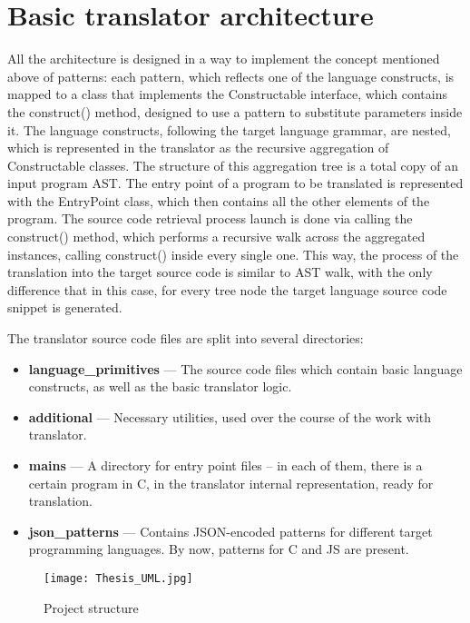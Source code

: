 \section{Basic translator architecture}
All the architecture is designed in a way to implement the concept mentioned above of patterns: each pattern, which reflects one of the language constructs, is mapped to a class that implements the Constructable interface, which contains the construct() method, designed to use a pattern to substitute parameters inside it.
The language constructs, following the target language grammar, are nested, which is represented in the translator as the recursive aggregation of Constructable classes. The structure of this aggregation tree is a total copy of an input program AST.
The entry point of a program to be translated is represented with the EntryPoint class, which then contains all the other elements of the program.
The source code retrieval process launch is done via calling the construct() method, which performs a recursive walk across the aggregated instances, calling construct() inside every single one. This way, the process of the translation into the target source code is similar to AST walk, with the only difference that in this case, for every tree node the target language source code snippet is generated.

The translator source code files are split into several directories:
\begin{itemize}
    \item \textbf{language\_primitives} --- The source code files which contain basic language constructs, as well as the basic translator logic.
    \item \textbf{additional} --- Necessary utilities, used over the course of the work with translator.
    \item \textbf{mains} --- A directory for entry point files -- in each of them, there is a certain program in C, in the translator internal representation, ready for translation.
    \item \textbf{json\_patterns} --- Contains JSON-encoded patterns for different target programming languages. By now, patterns for C and JS are present.
\end{itemize}

\begin{figure}[h!]
    \centering
    \texttt{[image: Thesis\_UML.jpg]}
    \caption{Project structure}
    \label{fig:Project_structure}
\end{figure}


